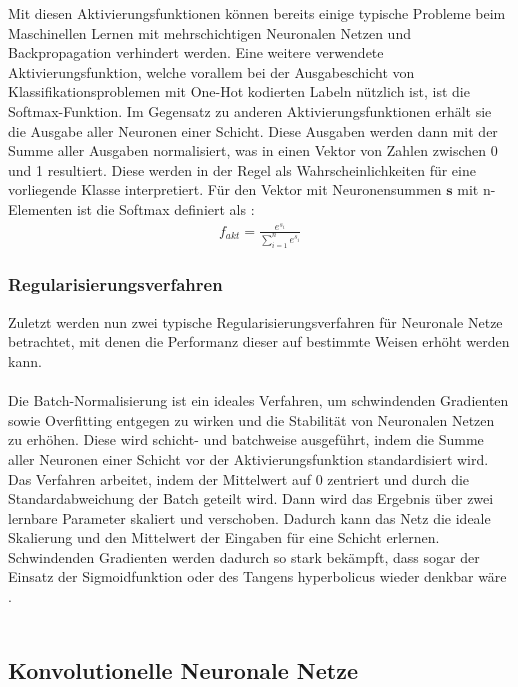 \documentclass[11pt,bibliography=totocnumbered]{scrartcl}
\newcommand{\myequations}[1]{%
\addcontentsline{equ}{myequations}{\protect\numberline{\theequation}#1}}
\begin{document}
Mit diesen Aktivierungsfunktionen können bereits einige typische Probleme beim Maschinellen Lernen mit mehrschichtigen Neuronalen Netzen und Backpropagation verhindert werden. Eine weitere verwendete Aktivierungsfunktion, welche vorallem bei der Ausgabeschicht von Klassifikationsproblemen mit One-Hot kodierten Labeln nützlich ist, ist die Softmax-Funktion. Im Gegensatz zu anderen Aktivierungsfunktionen erhält sie die Ausgabe aller Neuronen einer Schicht. Diese Ausgaben werden dann mit der Summe aller Ausgaben normalisiert, was in einen Vektor von Zahlen zwischen 0 und 1 resultiert. Diese werden in der Regel als Wahrscheinlichkeiten für eine vorliegende Klasse interpretiert. Für den Vektor mit Neuronensummen \ensuremath{\textbf{s}} mit n-Elementen ist die Softmax definiert als \cite[S.37]{BA}\cite[S.141-142, S.263]{MACHINE_LEARNING}: 
\begin{equation}
\label{eq:softmax}
\begin{aligned}
f_{akt} = \frac{e^{s_i}}{\sum_{i=1}^{n}e^{s_i}}
\end{aligned}
\end{equation}\myequations{Softmax}
\subsubsection{Regularisierungsverfahren}
Zuletzt werden nun zwei typische Regularisierungsverfahren für Neuronale Netze betrachtet, mit denen die Performanz dieser auf bestimmte Weisen erhöht werden kann.
\\\\
Die Batch-Normalisierung ist ein ideales Verfahren, um schwindenden Gradienten sowie Overfitting entgegen zu wirken und die Stabilität von Neuronalen Netzen zu erhöhen. Diese wird schicht- und batchweise ausgeführt, indem die Summe aller Neuronen einer Schicht vor der Aktivierungsfunktion standardisiert wird. Das Verfahren arbeitet, indem der Mittelwert auf 0 zentriert und durch die Standardabweichung der Batch geteilt wird. Dann wird das Ergebnis über zwei lernbare Parameter skaliert und verschoben. Dadurch kann das Netz die ideale Skalierung und den Mittelwert der Eingaben für eine Schicht erlernen. Schwindenden Gradienten werden dadurch so stark bekämpft, dass sogar der Einsatz der Sigmoidfunktion oder des Tangens hyperbolicus wieder denkbar wäre \cite[S.37-38]{BA}\cite[S.282-283]{MACHINE_LEARNING}.
\\\\

\subsection{Konvolutionelle Neuronale Netze}
\end{document}
